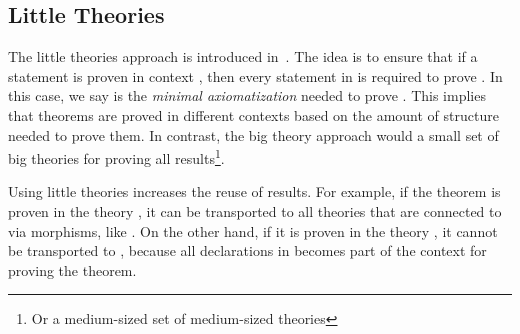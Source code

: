 
\subsection{Little Theories}
The little theories approach is introduced in~\cite{LittleTheories}. The idea is to ensure that if a statement  is proven in context \lstmath{$\Gamma$}, then every statement in \lstmath{$\Gamma$} is required to prove . In this case, we say \lstmath{$\Gamma$} is the \emph{minimal axiomatization} needed to prove . This implies that theorems are proved in different contexts based on the amount of structure needed to prove them. In contrast, the big theory approach would a small set of big theories for proving all results\footnote{Or a medium-sized set of medium-sized theories}. 

Using little theories increases the reuse of results. For example, if the theorem  is proven in the theory , it can be transported to all theories that are connected to  via morphisms, like . On the other hand, if it is proven in the theory , it cannot be transported to , because all declarations in  becomes part of the context for proving the theorem.  

